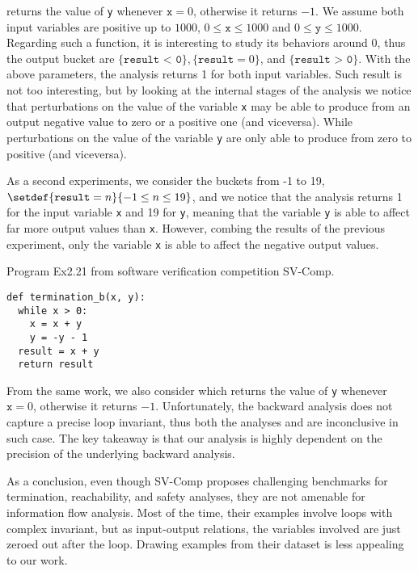  returns the value of \texttt{y} whenever $\texttt{x} = 0$, otherwise it returns $-1$.
We assume both input variables are positive up to $1000$, $0 \le \texttt{x} \le 1000$ and $0 \le \texttt{y} \le 1000$.
Regarding such a function, it is interesting to study its behaviors around $0$, thus the output bucket are $\{ \texttt{result < 0} \}, \{ \texttt{result} = 0 \}$, and $\{ \texttt{result > 0} \}$.
With the above parameters, the analysis \abstractoutcomesname{} returns 1 for both input variables.
Such result is not too interesting, but by looking at the internal stages of the analysis we notice that perturbations on the value of the variable \texttt{x} may be able to produce from an output negative value to zero or a positive one (and viceversa).
While perturbations on the value of the variable \texttt{y} are only able to produce from zero to positive (and viceversa).

As a second experiments, we consider the buckets from -1 to 19, $\setdef{ \texttt{result} = n}{-1 \le n \le 19}$, and we notice that the analysis \abstractoutcomesname{} returns 1 for the input variable \texttt{x} and 19 for \texttt{y}, meaning that the variable \texttt{y} is able to affect far more output values than \texttt{x}. However, combing the results of the previous experiment, only the variable \texttt{x} is able to affect the negative output values.

\begin{marginlisting}[-1.4cm]
  \caption{Program Ex2.21 from software verification competition SV-Comp.}
  \vspace{15pt}
\begin{lstlisting}[style=mystyle,
  language=customPython,
  escapechar=\%,
]
def termination_b(x, y):
  while x > 0:
    x = x + y
    y = -y - 1
  result = x + y
  return result
\end{lstlisting}
\end{marginlisting}

From the same work, we also consider  which returns the value of \texttt{y} whenever $\texttt{x} = 0$, otherwise it returns $-1$.
Unfortunately, the backward analysis does not capture a precise loop invariant, thus both the analyses \abstractoutcomesname{} and \abstractrangename are inconclusive in such case.
The key takeaway is that our analysis is highly dependent on the precision of the underlying backward analysis.

As a conclusion, even though SV-Comp proposes challenging benchmarks for termination, reachability, and safety analyses, they are not amenable for information flow analysis.
Most of the time, their examples involve loops with complex invariant, but as input-output relations, the variables involved are just zeroed out after the loop.
Drawing examples from their dataset is less appealing to our work.

